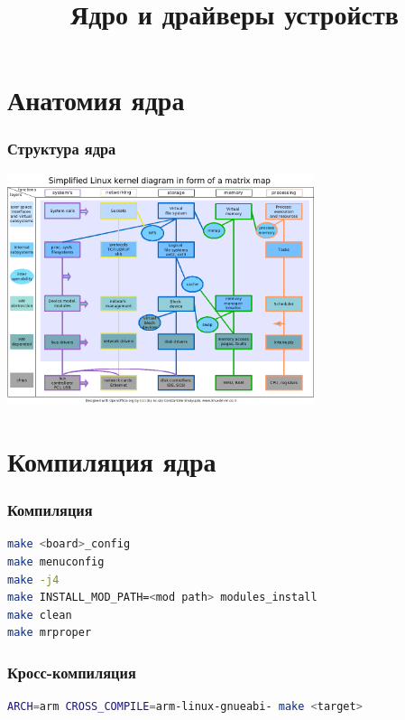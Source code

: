 

\title{Ядро и драйверы устройств}



\begin{frame}
  \frametitle{}
\end{frame}

\section{Анатомия ядра}

\begin{frame}
  \frametitle{Структура ядра}
  \includegraphics[width=9cm]{Linux_kernel_diagram.png}
\end{frame}

\section{Компиляция ядра}
\begin{frame}[fragile]
  \frametitle{Компиляция}
\begin{lstlisting}[language=bash]
make <board>_config
make menuconfig
make -j4
make INSTALL_MOD_PATH=<mod path> modules_install
make clean
make mrproper
\end{lstlisting}
\end{frame}

\begin{frame}[fragile]
  \frametitle{Кросс-компиляция}
\begin{lstlisting}[language=bash]
ARCH=arm CROSS_COMPILE=arm-linux-gnueabi- make <target>
\end{lstlisting}
\end{frame}
